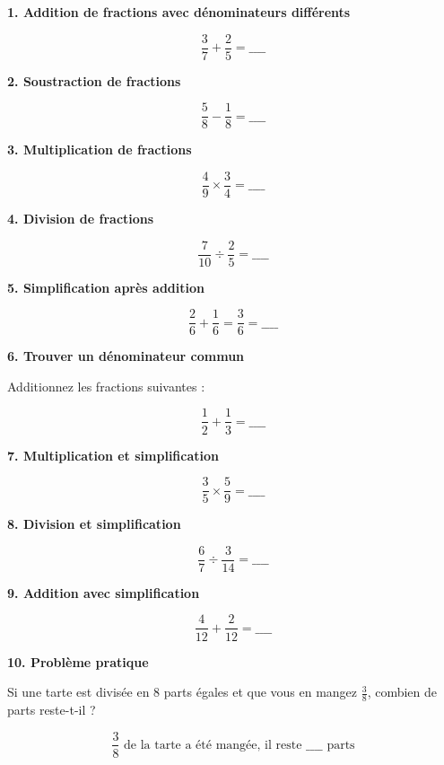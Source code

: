 \documentclass{article}
\begin{document}
\begin{tcolorbox}[colback=purple!10!white, colframe=yellow!75!black, title=\textcolor{white}{Application directe}, sharp corners=south, boxrule=0.8mm]
    \textbf{1. Addition de fractions avec dénominateurs différents}
    
    \[
    \frac{3}{7} + \frac{2}{5} = \_\_\_\_
    \]
    
    \vspace{10pt}
    
    \textbf{2. Soustraction de fractions}
    
    \[
    \frac{5}{8} - \frac{1}{8} = \_\_\_\_
    \]
    
    \vspace{10pt}
    
    \textbf{3. Multiplication de fractions}
    
    \[
    \frac{4}{9} \times \frac{3}{4} = \_\_\_\_
    \]
    
    \vspace{10pt}
    
    \textbf{4. Division de fractions}
    
    \[
    \frac{7}{10} \div \frac{2}{5} = \_\_\_\_
    \]
    
    \vspace{10pt}
    
    \textbf{5. Simplification après addition}
    
    \[
    \frac{2}{6} + \frac{1}{6} = \frac{3}{6} = \_\_\_\_
    \]
    
    \vspace{10pt}
    
    \textbf{6. Trouver un dénominateur commun}
    
    Additionnez les fractions suivantes :
    
    \[
    \frac{1}{2} + \frac{1}{3} = \_\_\_\_
    \]
    
    \vspace{10pt}
    
    \textbf{7. Multiplication et simplification}
    
    \[
    \frac{3}{5} \times \frac{5}{9} = \_\_\_\_
    \]
    
    \vspace{10pt}
    
    \textbf{8. Division et simplification}
    
    \[
    \frac{6}{7} \div \frac{3}{14} = \_\_\_\_
    \]
    
    \vspace{10pt}
    
    \textbf{9. Addition avec simplification}
    
    \[
    \frac{4}{12} + \frac{2}{12} = \_\_\_\_
    \]
    
    \vspace{10pt}
    
    \textbf{10. Problème pratique}
    
    Si une tarte est divisée en 8 parts égales et que vous en mangez \(\frac{3}{8}\), combien de parts reste-t-il ?
    
    \[
    \frac{3}{8} \text{ de la tarte a été mangée, il reste } \_\_\_\_ \text{ parts}
    \]
\end{tcolorbox}
\end{document}
